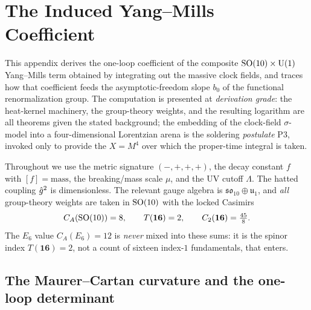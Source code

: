 \section{The Induced Yang--Mills Coefficient}
\label{sec:app-ym:main}

This appendix derives the one-loop coefficient of the composite
$\mathrm{SO}(10)\times\mathrm{U}(1)$ Yang--Mills term obtained by integrating out the
massive clock fields, and traces how that coefficient feeds the
asymptotic-freedom slope $b_{0}$ of the functional renormalization group.
The computation is presented at \emph{derivation grade}: the heat-kernel
machinery, the group-theory weights, and the resulting logarithm are all
theorems given the stated background; the embedding of the clock-field
$\sigma$-model into a four-dimensional Lorentzian arena is the soldering
\emph{postulate} P3, invoked only to provide the $X=M^{4}$ over which the
proper-time integral is taken.

Throughout we use the metric signature $(-,+,+,+)$, the decay constant
$f$ with $[f]=\text{mass}$, the breaking/mass scale $\mu$, and the UV
cutoff $\Lambda$. The hatted coupling $\hat g^{2}$ is dimensionless. The
relevant gauge algebra is $\mathfrak{so}_{10}\oplus\mathfrak u_{1}$, and
\emph{all} group-theory weights are taken in $\mathrm{SO}(10)$ with the locked
Casimirs
\begin{equation}\label{eq:app-ym:casimirs}
  C_{A}(\mathrm{SO}(10))=8,\qquad
  T(\mathbf{16})=2,\qquad
  C_{2}(\mathbf{16})=\tfrac{45}{8}.
\end{equation}
The $E_{6}$ value $C_{A}(E_{6})=12$ is \emph{never} mixed into these
sums: it is the spinor index $T(\mathbf{16})=2$, not a count of sixteen
index-$1$ fundamentals, that enters.

\subsection{The Maurer--Cartan curvature and the one-loop determinant}
\label{sec:app-ym:setup}

